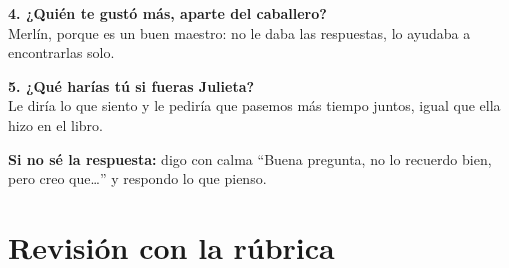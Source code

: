 \documentclass[12pt,a4paper]{article}
\begin{document}
\textbf{4. ¿Quién te gustó más, aparte del caballero?}\\
Merlín, porque es un buen maestro: no le daba las respuestas, lo ayudaba a encontrarlas solo.

\textbf{5. ¿Qué harías tú si fueras Julieta?}\\
Le diría lo que siento y le pediría que pasemos más tiempo juntos, igual que ella hizo en el libro.

\textbf{Si no sé la respuesta:} digo con calma “Buena pregunta, no lo recuerdo bien, pero creo que…” y respondo lo que pienso.

\vspace{8pt}
\section*{Revisión con la rúbrica}
\renewcommand{\arraystretch}{1.25}
\end{document}
